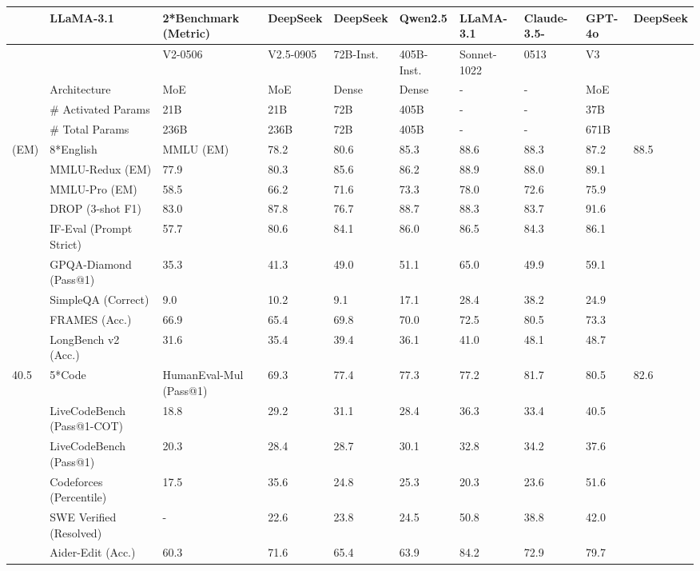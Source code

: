 \documentclass[11pt,a4paper]{article}
\begin{document}
\begin{table}[h]
\begin{tabular}{|l|l|l|l|l|l|l|l|l|l|}
\hline
 & LLaMA-3.1 & 2*Benchmark (Metric) & DeepSeek & DeepSeek & Qwen2.5 & LLaMA-3.1 & Claude-3.5- & GPT-4o & DeepSeek \\ \hline
 &  & V2-0506 & V2.5-0905 & 72B-Inst. & 405B-Inst. & Sonnet-1022 & 0513 & V3 &  \\ \hline
 & Architecture & MoE & MoE & Dense & Dense & - & - & MoE &  \\ \hline
 & \# Activated Params & 21B & 21B & 72B & 405B & - & - & 37B &  \\ \hline
 & \# Total Params & 236B & 236B & 72B & 405B & - & - & 671B &  \\ \hline
(EM) & 8*English & MMLU (EM) & 78.2 & 80.6 & 85.3 & 88.6 & 88.3 & 87.2 & 88.5 \\ \hline
 & MMLU-Redux (EM) & 77.9 & 80.3 & 85.6 & 86.2 & 88.9 & 88.0 & 89.1 &  \\ \hline
 & MMLU-Pro (EM) & 58.5 & 66.2 & 71.6 & 73.3 & 78.0 & 72.6 & 75.9 &  \\ \hline
 & DROP (3-shot F1) & 83.0 & 87.8 & 76.7 & 88.7 & 88.3 & 83.7 & 91.6 &  \\ \hline
 & IF-Eval (Prompt Strict) & 57.7 & 80.6 & 84.1 & 86.0 & 86.5 & 84.3 & 86.1 &  \\ \hline
 & GPQA-Diamond (Pass@1) & 35.3 & 41.3 & 49.0 & 51.1 & 65.0 & 49.9 & 59.1 &  \\ \hline
 & SimpleQA (Correct) & 9.0 & 10.2 & 9.1 & 17.1 & 28.4 & 38.2 & 24.9 &  \\ \hline
 & FRAMES (Acc.) & 66.9 & 65.4 & 69.8 & 70.0 & 72.5 & 80.5 & 73.3 &  \\ \hline
 & LongBench v2 (Acc.) & 31.6 & 35.4 & 39.4 & 36.1 & 41.0 & 48.1 & 48.7 &  \\ \hline
40.5 & 5*Code & HumanEval-Mul (Pass@1) & 69.3 & 77.4 & 77.3 & 77.2 & 81.7 & 80.5 & 82.6 \\ \hline
 & LiveCodeBench (Pass@1-COT) & 18.8 & 29.2 & 31.1 & 28.4 & 36.3 & 33.4 & 40.5 &  \\ \hline
 & LiveCodeBench (Pass@1) & 20.3 & 28.4 & 28.7 & 30.1 & 32.8 & 34.2 & 37.6 &  \\ \hline
 & Codeforces (Percentile) & 17.5 & 35.6 & 24.8 & 25.3 & 20.3 & 23.6 & 51.6 &  \\ \hline
 & SWE Verified (Resolved) & - & 22.6 & 23.8 & 24.5 & 50.8 & 38.8 & 42.0 &  \\ \hline
 & Aider-Edit (Acc.) & 60.3 & 71.6 & 65.4 & 63.9 & 84.2 & 72.9 & 79.7 &  \\ \hline

\end{tabular}
\end{table}
\end{document}
